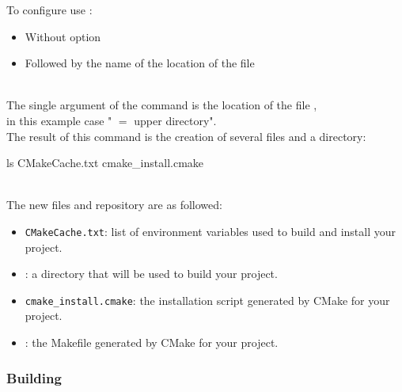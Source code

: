 To configure use :
\begin{itemize}
\item Without option
\item Followed by the name of the location of the file 
\end{itemize}
\vspace{-1cm}
\begin{script}
  
\end{script}
\\[-0.5cm]
\noindent The single argument of the command is the location of the file , \\
in this example case " $=$ upper directory". \\
The result of this command is the creation of several files and a directory:
\begin{script}
 ls
CMakeCache.txt    cmake_install.cmake  
\end{script}
\\[-0.5cm]
\noindent The new files and repository are as followed:
\begin{itemize}
\item \texttt{CMakeCache.txt}: list of environment variables used to build and install your project. 
\item {}: a directory that will be used to build your project. 
\item \texttt{cmake\_install.cmake}: the installation script generated by CMake for your project.
\item {}: the Makefile generated by CMake for your project.
\end{itemize}

\subsubsection*{Building}


